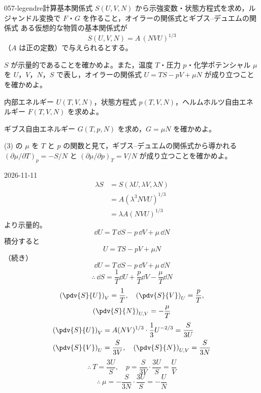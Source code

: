 \documentclass[uplatex,dvipdfmx,a4paper,11pt]{jsarticle}
\begin{document}
\begin{mondai}{057-legendre}{計算}{基本関係式 $S(U,V,N)$ から示強変数・状態方程式を求め，ルジャンドル変換で $F$・$G$ を作ること，オイラーの関係式とギブス--デュエムの関係式}
ある仮想的な物質の基本関係式が
\[ S(U,V,N)=A\,(NVU)^{1/3} \]
（$A$ は正の定数）で与えられるとする。
\begin{shoumon}
  \item $S$ が示量的であることを確かめよ。また，温度 $T$・圧力 $p$・化学ポテンシャル $\mu$ を $U$，$V$，$N$，$S$ で表し，オイラーの関係式 $U=TS-pV+\mu N$ が成り立つことを確かめよ。
  \item 内部エネルギー $U(T,V,N)$，状態方程式 $p(T,V,N)$，ヘルムホルツ自由エネルギー $F(T,V,N)$ を求めよ。
  \item ギブス自由エネルギー $G(T,p,N)$ を求め，$G=\mu N$ を確かめよ。
  \item (3) の $\mu$ を $T$ と $p$ の関数と見て，ギブス--デュエムの関係式から導かれる $(\partial\mu/\partial T)_{p}=-S/N$ と $(\partial\mu/\partial p)_{T}=V/N$ が成り立つことを確かめよ。
\end{shoumon}
\begin{kotaeutsushi}{2026-11-11}
\begin{align*}
\lambda S&=S(\lambda U,\lambda V,\lambda N)\\
&=A(\lambda^{3}NVU)^{1/3}\\
&=\lambda A(NVU)^{1/3}
\end{align*}
より示量的。
\[ \dd U=T\,\dd S-p\,\dd V+\mu\,\dd N \]
積分すると
\[ U=TS-pV+\mu N \]
（続き）
\[ \dd U=T\,\dd S-p\,\dd V+\mu\,\dd N \]
\[ \therefore\ \dd S=\frac{1}{T}\dd U+\frac{p}{T}\dd V-\frac{\mu}{T}\dd N \]
\begin{gather*}
\left(\pdv{S}{U}\right)_{V}=\frac{1}{T},\quad\left(\pdv{S}{V}\right)_{U}=\frac{p}{T},\\
\left(\pdv{S}{N}\right)_{U,V}=-\frac{\mu}{T}
\end{gather*}
\begin{align*}
\left(\pdv{S}{U}\right)_{V}&=A(NV)^{1/3}\cdot\frac{1}{3}U^{-2/3}=\frac{S}{3U}\\
\left(\pdv{S}{V}\right)_{U}&=\frac{S}{3V},\quad\left(\pdv{S}{N}\right)_{U,V}=\frac{S}{3N}
\end{align*}
\[ \therefore\ T=\frac{3U}{S},\quad p=\frac{S}{3V}\cdot\frac{3U}{S}=\frac{U}{V} \]
\[ \therefore\ \mu=-\frac{S}{3N}\cdot\frac{3U}{S}=-\frac{U}{N} \]

\end{kotaeutsushi}
\end{mondai}
\end{document}
